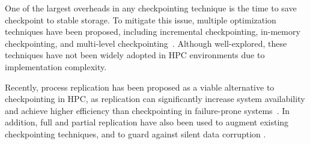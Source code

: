 One of the largest overheads in any checkpointing technique is the time to save checkpoint
to stable storage. %
To mitigate this issue, multiple optimization techniques have been proposed, including incremental checkpointing, in-memory checkpointing, and multi-level checkpointing~\cite{Gao:2015:RIC:2751205.2751212,Agarwal:04:Adaptive,zheng2004ftc,Moody:10:SCR}.
 Although well-explored, these techniques have not been widely adopted
in HPC environments due to implementation complexity. 

Recently, process replication has been proposed as a viable alternative to checkpointing in HPC, as replication can significantly increase system availability and achieve higher efficiency than checkpointing in failure-prone systems~\cite{riesen_sandia_2010,Cappello:09:Fault}.
In addition, full and partial
replication have also been used to augment existing checkpointing techniques, and to guard
against silent data corruption \cite{elliott_2012_cpr,ni_2013_acr,fiala_2012_sdc}.


